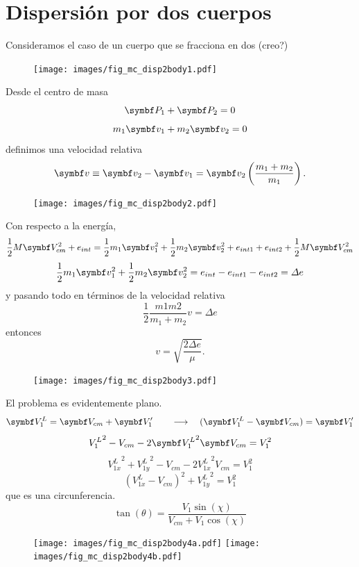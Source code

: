 \documentclass[10pt,oneside]{CBFT_book}
\begin{document}
\section{Dispersión por dos cuerpos}

Consideramos el caso de un cuerpo que se fracciona en dos (creo?)
\begin{figure}[htb]
	\begin{center}
	\texttt{[image: images/fig\_mc\_disp2body1.pdf]}	 
	\end{center}
	\caption{}
\end{figure} 
Desde el centro de masa
\[
	\vb{P}_1 + \vb{P}_2 = 0
\]
\[
	m_1 \vb{v}_1 + m_2 \vb{v}_2 = 0
\]
definimos una velocidad relativa
\[
	\vb{v} \equiv \vb{v}_2  - \vb{v}_1 = \vb{v}_2 \left( \frac{ m_1 + m_2 }{ m_1 }\right) .
\]
\begin{figure}[htb]
	\begin{center}
	\texttt{[image: images/fig\_mc\_disp2body2.pdf]}	 
	\end{center}
	\caption{}
\end{figure} 
Con respecto a la energía,
\[
	\frac{1}{2} M \vb{V}_{cm}^2 + e_{int} = \frac{1}{2} m_1 \vb{v}_1^2 + \frac{1}{2} m_2 \vb{v}_2^2
						+ e_{int 1 } + e_{int 2} + \frac{1}{2} M \vb{V}_{cm}^2
\]
\[
	\frac{1}{2} m_1 \vb{v}_1^2 + \frac{1}{2} m_2 \vb{v}_2^2 = e_{int} - e_{int 1 } - e_{int 2} = \Delta e
\]
y pasando todo en términos de la velocidad relativa
\[
	 \frac{1}{2} \frac{m1 m2}{ m_1 + m_2 } v = \Delta e
\]
entonces 
\[
	v = \sqrt{\frac{ 2 \Delta e}{ \mu } }.
\]
\begin{figure}[htb]
	\begin{center}
	\texttt{[image: images/fig\_mc\_disp2body3.pdf]}	 
	\end{center}
	\caption{}
\end{figure} 

El problema es evidentemente plano.
\[
	\vb{V}_1^L =  \vb{V}_{cm} + \vb{V}_1' \qquad \longrightarrow \quad ( \vb{V}_1^L - \vb{V}_{cm} ) = \vb{V}_1'
\]
\[
	{V_1^L}^2 - V_{cm} - 2 {\vb{V}_1^L}^2 \vb{V}_{cm} = V_1^2
\]
\[
	{V_{1x}^L}^2 + {V_{1y}^L}^2 - V_{cm} - 2 {V_{1x}^L}^2 V_{cm} = V_1^2
\]
\[
	( V_{1x}^L  - V_{cm} )^2 + {V_{1y}^L}^2 = V_1^2
\]
que es una circunferencia.
\[
	\tan(\theta) = \frac{V_1 \sin(\chi) }{ V_{cm} + V_1 \cos(\chi) }
\]
\begin{figure}[htb]
	\begin{center}
	\texttt{[image: images/fig\_mc\_disp2body4a.pdf]}	 
	\texttt{[image: images/fig\_mc\_disp2body4b.pdf]}
	\end{center}
	\caption{}
\end{figure} 
\end{document}
